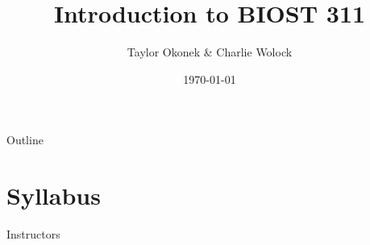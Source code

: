\documentclass[10pt,t]{beamer}
\title{Introduction to BIOST 311}
\author{Taylor Okonek \& Charlie Wolock}
\date{\today}
\begin{document}
	\begin{frame}
	\titlepage 
\end{frame}
\begin{frame}{Outline}
\tableofcontents
\end{frame}


\section{Syllabus}

\begin{frame}{Instructors}


\end{frame}
\end{document}
